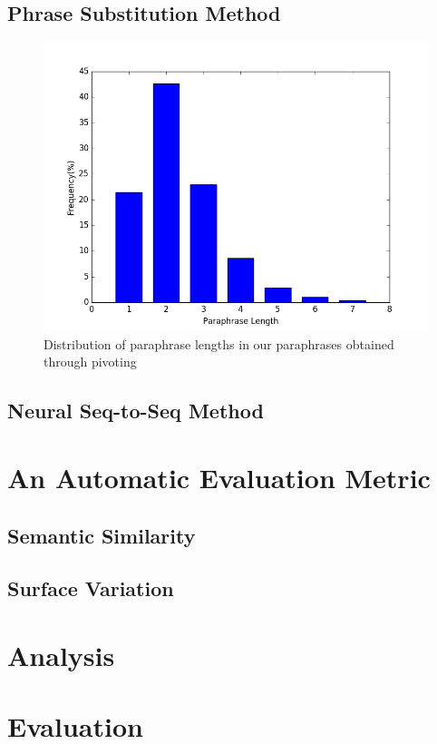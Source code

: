 \documentclass[11pt,letterpaper]{article}
\begin{document}
\subsection{Phrase Substitution Method}
\begin{figure}
\includegraphics[scale=0.4]{phrase_len}
\caption{Distribution of paraphrase lengths in our paraphrases obtained through pivoting}
\label{fig:para_length}
\end{figure}
\subsection{Neural Seq-to-Seq Method}

\section{An Automatic Evaluation Metric}
\subsection{Semantic Similarity}	
\subsection{Surface Variation}

\section{Analysis}

\section{Evaluation}
\end{document}
